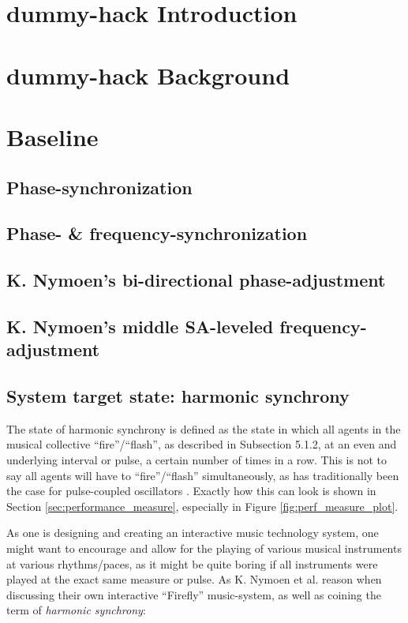 


	\chapter{dummy-hack Introduction}
	\chapter{dummy-hack Background}
	\chapter{Baseline}
		\section{Phase-synchronization}
		\section{Phase- \& frequency-synchronization}
		\section{K. Nymoen's bi-directional phase-adjustment}
		\section{K. Nymoen's middle SA-leveled frequency-adjustment}
		\section{System target state: harmonic synchrony}
		\label{sec:harmonic_synchrony}
		The state of harmonic synchrony is defined \cite{nymoen_synch} as the state in which all agents in the musical collective ``fire''/``flash'', as described in Subsection 5.1.2, at an even and underlying interval or pulse, a certain number of times in a row. This is not to say all agents will have to ``fire''/``flash'' simultaneously, as has traditionally been the case for pulse-coupled oscillators \cite{}. Exactly how this can look is shown in Section \ref{sec:performance_measure}, especially in Figure \ref{fig:perf_measure_plot}.

		As one is designing and creating an interactive music technology system, one might want to encourage and allow for the playing of various musical instruments at various rhythms/paces, as it might be quite boring if all instruments were played at the exact same measure or pulse. As K. Nymoen et al. \cite{nymoen_synch} reason when discussing their own interactive ``Firefly'' music-system, as well as coining the term of \textit{harmonic synchrony}: \nl

